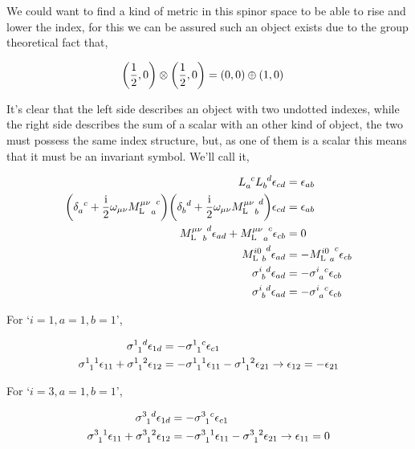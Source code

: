 We could want to find a kind of metric in this spinor space to be able to rise and lower the index, for this we can be assured such an object exists due to the group theoretical fact that,

\begin{align}
    \qty(\frac12,0)\otimes\qty(\frac12,0)&=\qty(0,0)\oplus\qty(1,0)\nonumber
\end{align}

It's clear that the left side describes an object with two undotted indexes, while the right side describes the sum of a scalar with an other kind of object, the two must possess the same index structure, but, as one of them is a scalar this means that it must be an invariant symbol. We'll call it,

\begin{align}
    \tensor{L}{_a^c}\tensor{L}{_b^d}\epsilon_{cd}&=\epsilon_{ab}\nonumber\\
    \qty(\tensor{\delta}{_a^c}+\frac\im2\omega_{\mu\nu}\tensor{{{M_{\textnormal L}^{\mu\nu}}}}{_a^c})\qty(\tensor{\delta}{_b^d}+\frac\im2\omega_{\mu\nu}\tensor{{{M_{\textnormal L}^{\mu\nu}}}}{_b^d})\epsilon_{cd}&=\epsilon_{ab}\nonumber\\
    \tensor{{{M_{\textnormal L}^{\mu\nu}}}}{_b^d}\epsilon_{ad}+\tensor{{{M_{\textnormal L}^{\mu\nu}}}}{_a^c}\epsilon_{cb}&=0\nonumber\\
    \tensor{{{M_{\textnormal L}^{i0}}}}{_b^d}\epsilon_{ad}&=-\tensor{{{M_{\textnormal L}^{i0}}}}{_a^c}\epsilon_{cb}\nonumber\\
    \tensor{\sigma}{^i_b^d}\epsilon_{ad}&=-\tensor{\sigma}{^i_a^c}\epsilon_{cb}\nonumber\\
    \tensor{\sigma}{^i_b^d}\epsilon_{ad}&=-\tensor{\sigma}{^i_a^c}\epsilon_{cb}\nonumber
\end{align}

For `$i=1,a=1,b=1$',

\begin{align}
    \tensor{\sigma}{^1_1^d}\epsilon_{1d}&=-\tensor{\sigma}{^1_1^c}\epsilon_{c1}\nonumber\\
    \tensor{\sigma}{^1_1^1}\epsilon_{11}+\tensor{\sigma}{^1_1^2}\epsilon_{12}&=-\tensor{\sigma}{^1_1^1}\epsilon_{11}-\tensor{\sigma}{^1_1^2}\epsilon_{21}\rightarrow\epsilon_{12}=-\epsilon_{21}\nonumber
\end{align}

For `$i=3,a=1,b=1$',

\begin{align}
    \tensor{\sigma}{^3_1^d}\epsilon_{1d}&=-\tensor{\sigma}{^3_1^c}\epsilon_{c1}\nonumber\\
    \tensor{\sigma}{^3_1^1}\epsilon_{11}+\tensor{\sigma}{^3_1^2}\epsilon_{12}&=-\tensor{\sigma}{^3_1^1}\epsilon_{11}-\tensor{\sigma}{^3_1^2}\epsilon_{21}\rightarrow\epsilon_{11}=0\nonumber
\end{align}

